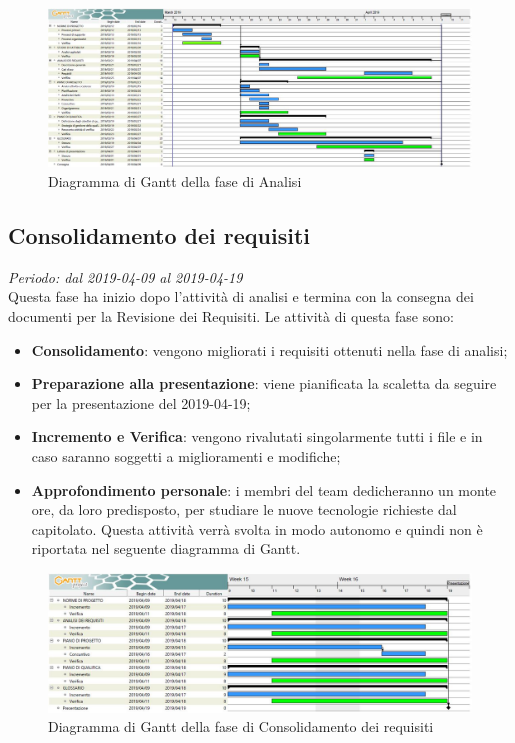 \begin{figure}[H]
	\includegraphics[width=0.99\linewidth]{res/images/gantt_analisi.jpg}
	\caption{Diagramma di Gantt della fase di Analisi}
\end{figure}

\subsection{Consolidamento dei requisiti}
\textit{Periodo: dal 2019-04-09 al 2019-04-19} \\
Questa fase ha inizio dopo l'attività di analisi e termina con la consegna dei documenti per la Revisione dei Requisiti. Le attività 
di questa fase sono:
\begin{itemize}
	\item \textbf{Consolidamento}: vengono migliorati i requisiti ottenuti nella fase di analisi;
	\item \textbf{Preparazione alla presentazione}: viene pianificata la scaletta da seguire per la presentazione del 2019-04-19;
	\item \textbf{Incremento e Verifica}: vengono rivalutati singolarmente tutti i file e in caso saranno soggetti a miglioramenti e modifiche;
	\item \textbf{Approfondimento personale}: i membri del team dedicheranno un monte ore, da loro predisposto, per studiare le nuove tecnologie richieste dal capitolato\glo. Questa attività verrà svolta in modo autonomo e quindi non è riportata nel seguente diagramma di Gantt.%
\end{itemize}

\begin{figure}[H]
	\includegraphics[width=0.99\linewidth]{res/images/gant_cons.jpg}
	\caption{Diagramma di Gantt della fase di Consolidamento dei requisiti}
\end{figure}

